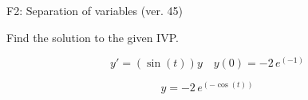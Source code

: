 \begin{exercise}
  \begin{exerciseTitle}F2: Separation of variables (ver. 45)\end{exerciseTitle}
  \begin{exerciseStatement}
    
Find the solution to the given IVP.

    
\[y'=( \sin\left(t\right) )y\hspace{1em} y(0)= -2 \, e^{\left(-1\right)}\]

  \end{exerciseStatement}
  \begin{exerciseAnswer}
    
\[y= -2 \, e^{\left(-\cos\left(t\right)\right)}\]

  \end{exerciseAnswer}
\end{exercise}